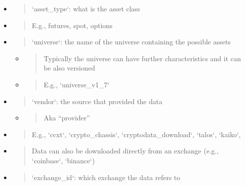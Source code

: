 \documentclass[11pt, reqno]{amsart}
\begin{document}
\begin{itemize}
\item
  \begin{quote}
  `asset\_type`: what is the asset class
  \end{quote}
\end{itemize}

\begin{itemize}
\item
  \begin{quote}
  E.g., futures, spot, options
  \end{quote}
\end{itemize}

\begin{itemize}
\item
  \begin{quote}
  `universe`: the name of the universe containing the possible assets
  \end{quote}

  \begin{itemize}
  \item
    \begin{quote}
    Typically the universe can have further characteristics and it can
    be also versioned
    \end{quote}
  \item
    \begin{quote}
    E.g., `universe\_v1\_7`
    \end{quote}
  \end{itemize}
\item
  \begin{quote}
  `vendor`: the source that provided the data
  \end{quote}

  \begin{itemize}
  \item
    \begin{quote}
    Aka ``provider''
    \end{quote}
  \end{itemize}
\end{itemize}

\begin{itemize}
\item
  \begin{quote}
  E.g., `ccxt`, `crypto\_chassis`, `cryptodata\_download`, `talos`,
  `kaiko`,
  \end{quote}
\item
  \begin{quote}
  Data can also be downloaded directly from an exchange (e.g.,
  `coinbase`, `binance`)
  \end{quote}
\item
  \begin{quote}
  `exchange\_id`: which exchange the data refers to
  \end{quote}
\end{itemize}
\end{document}
